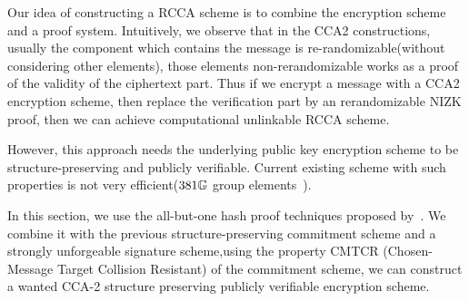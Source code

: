 Our idea of constructing a RCCA scheme is to combine the encryption scheme and a proof system.
Intuitively, we observe that in the CCA2 constructions, usually the component which contains the message is re-randomizable(without considering other elements),
those elements non-rerandomizable works as a proof of the validity of the ciphertext part.
Thus if we encrypt a message with a CCA2 encryption scheme,
then replace the verification part by an rerandomizable NIZK proof, then we can achieve computational unlinkable RCCA scheme.

However, this approach needs the underlying public key encryption scheme to be structure-preserving and publicly verifiable.
Current existing scheme with such properties is not very efficient($381\mathbb{G}$ group elements~\cite{DBLP:conf/pkc/AbeDKNO13}).

In this section, we use the all-but-one hash proof techniques proposed by~\cite{DBLP:conf/tcc/LibertY12}. We combine it with the previous structure-preserving commitment scheme and a strongly unforgeable signature scheme,using the property CMTCR (Chosen-Message Target Collision Resistant) of the commitment scheme, we can construct a wanted CCA-2 structure preserving publicly verifiable encryption scheme.
